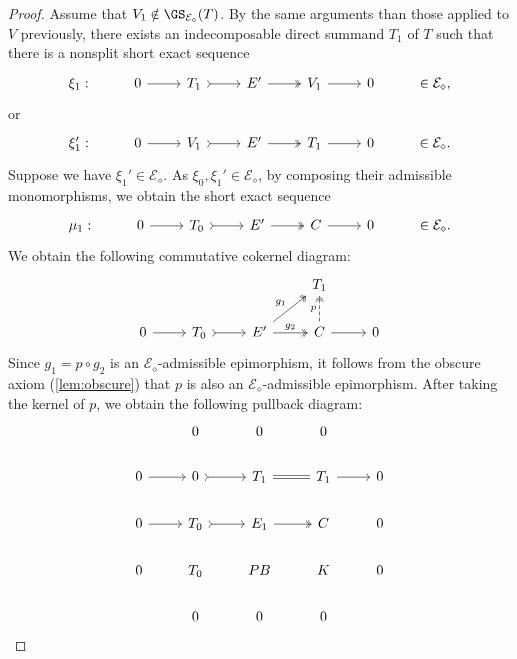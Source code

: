 \begin{proof}
Assume that $V_1 \notin \GS_{\mathcal{E_\diamond}}(T)$. By the same arguments than those applied to $V$ previously, there exists an indecomposable direct summand $T_1$ of $T$ such that there is a nonsplit short exact sequence \[\begin{tikzcd}
	\xi_1: & 0 & T_1 & E' & V_1 &  0 & \in \mathcal{E}_\diamond,
	\arrow[from=1-2, to=1-3]
	\arrow[tail, from=1-3, to=1-4]
	\arrow[two heads,from=1-4, to=1-5]
	\arrow[from=1-5, to=1-6]
\end{tikzcd}\]  or \[\begin{tikzcd}
	\xi_1': & 0 & V_1 & E' & T_1 &  0 & \in \mathcal{E}_\diamond.
	\arrow[from=1-2, to=1-3]
	\arrow[tail, from=1-3, to=1-4]
	\arrow[two heads,from=1-4, to=1-5]
	\arrow[from=1-5, to=1-6]
\end{tikzcd}\] 
Suppose we have $\xi_1' \in \mathcal{E_\diamond}$. As $\xi_0,\xi_1' \in \mathcal{E_\diamond}$, by composing their admissible monomorphisms, we obtain the short exact sequence \[\begin{tikzcd}
	\mu_1: & 0 & T_0 & E' & C &  0 & \in \mathcal{E}_\diamond.
	\arrow[from=1-2, to=1-3]
	\arrow[tail, from=1-3, to=1-4]
	\arrow[two heads,from=1-4, to=1-5]
	\arrow[from=1-5, to=1-6]
\end{tikzcd}\] We obtain the following commutative cokernel diagram:
\[\begin{tikzcd}
         & & & T_1 & \\
	 0 & T_0 & E' & C &  0 
	\arrow[from=2-1, to=2-2]
	\arrow[tail, from=2-2, to=2-3]
	\arrow[two heads,"g_2",from=2-3, to=2-4]
        \arrow[two heads,"g_1",from=2-3, to=1-4]
        \arrow[two heads,dashed,"p",from=2-4, to=1-4]
	\arrow[from=2-4, to=2-5]
\end{tikzcd}\] 
Since $g_1 = p \circ g_2$ is an $ \mathcal{E}_\diamond$-admissible epimorphism, it follows from the obscure axiom (\cref{lem:obscure}) that $p$ is also an $\mathcal{E}_\diamond$-admissible epimorphism. After taking the kernel of $p$, we obtain the following pullback diagram:
\[\begin{tikzcd}
         & 0 & 0 & 0 &  \\
	0 & 0 & T_1  & T_1 &  0 \\
     0 & T_0 & E_1 & C & 0 \\
      0 & T_0 & PB & K & 0 \\
       & 0 & 0 & 0 & 
	\arrow[from=2-1, to=2-2]
	\arrow[tail, from=2-2, to=2-3]
	\arrow[equals,from=2-3, to=2-4]
	\arrow[from=2-4, to=2-5]
        \arrow[from=3-1, to=3-2]
	\arrow[tail, from=3-2, to=3-3]
	\arrow[two heads,from=3-3, to=3-4]

\end{tikzcd}\]
\end{proof}
